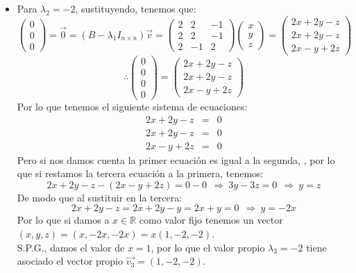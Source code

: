 \begin{itemize}
\begin{itemize}
\item Para $\lambda_2=-2$, sustituyendo, tenemos que:
    \[\begin{pmatrix}0\\
0\\0\end{pmatrix}=\vec{0}=(B-\lambda_1I_{n\times n })\vec{v}=\begin{pmatrix}2&2&-1\\
2&2&-1\\
2&-1&2\end{pmatrix}\begin{pmatrix}x\\
y\\z\end{pmatrix}=\begin{pmatrix}2x+2y-z\\
2x+2y-z\\2x-y+2z\end{pmatrix}\]
\[\therefore \begin{pmatrix}0\\
0\\0\\0\end{pmatrix}=\begin{pmatrix}2x+2y-z\\
2x+2y-z\\2x-y+2z\end{pmatrix}\]
Por lo que tenemos el siguiente sistema de ecuaciones:
\begin{eqnarray*}
2x+2y-z&=&0\\
2x+2y-z&=&0\\2x-y+2z&=&0
\end{eqnarray*}
Pero si nos damos cuenta la primer ecuaci\'on es igual a la segunda,
, por lo que si restamos la tercera ecuaci\'on a la primera, tenemos:
\[2x+2y-z-(2x-y+2z)=0-0~~\Longrightarrow~3y-3z=0~~\Longrightarrow~y=z\]
De modo que al sustituir en la tercera:
\[2x+2y-z=2x+2y-y=2x+y=0~~\Longrightarrow~y=-2x\]Por lo que si damos a $x\in\mathbb{R}$ como valor fijo tenemos un vector $(x,y,z)=(x,-2x,-2x)=x(1,-2,-2)$.\\
S.P.G., damos el valor de $x=1$, por lo que el valor propio $\lambda_3=-2$ tiene asociado el vector propio $\vec{v_3}=(1,-2,-2)$.


\end{itemize}
\end{itemize}